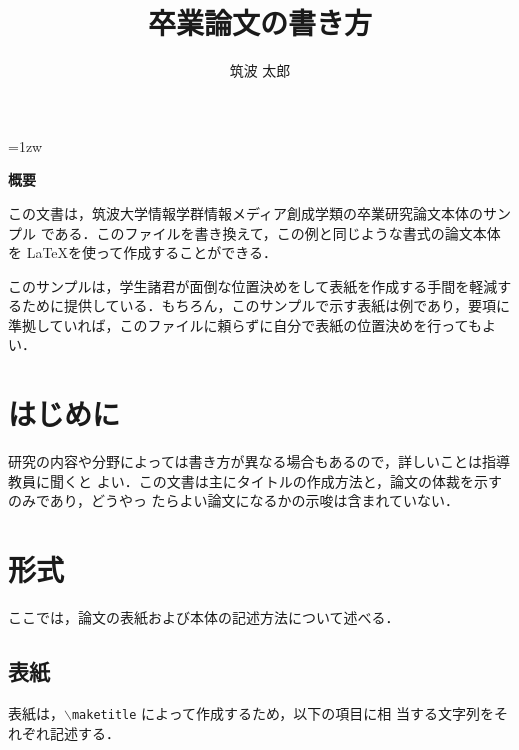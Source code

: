 \documentclass[a4paper,11pt]{ujreport}
\title{卒業論文の書き方}
\author{筑波 太郎}
\begin{document}
\maketitle
\thispagestyle{empty}
\newpage

\thispagestyle{empty}
\vspace*{20pt plus 1fil}
\parindent=1zw
\noindent
\begin{center}
{\bf 概要}
\vspace{5mm}
\end{center}
この文書は，筑波大学情報学群情報メディア創成学類の卒業研究論文本体のサンプル
である．このファイルを書き換えて，この例と同じような書式の論文本体を
\LaTeX を使って作成することができる．

このサンプルは，学生諸君が面倒な位置決めをして表紙を作成する手間を軽減す
るために提供している．もちろん，このサンプルで示す表紙は例であり，要項に
準拠していれば，このファイルに頼らずに自分で表紙の位置決めを行ってもよい．

\par
\vspace{0pt plus 1fil}
\newpage

\tableofcontents
\listoffigures

\pagebreak \setcounter{page}{1}


\chapter{はじめに}

研究の内容や分野によっては書き方が異なる場合もあるので，詳しいことは指導教員に聞くと
よい．この文書は主にタイトルの作成方法と，論文の体裁を示すのみであり，どうやっ
たらよい論文になるかの示唆は含まれていない．

\chapter{形式}

ここでは，論文の表紙および本体の記述方法について述べる．

\section{表紙}

表紙は，{\tt $\backslash$maketitle} によって作成するため，以下の項目に相
当する文字列をそれぞれ記述する．
\end{document}
